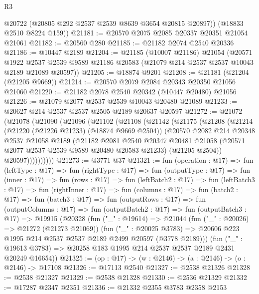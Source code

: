 \begin{lexlean}{R3}
\begin{coremodule}
        @20722
        (@20805 @292 @2537 @2539 @8639 @3654 @20815 @20897))
      (@18833 @2510 @8224 @159))
@21181 := @20570 @2075 @2085 @20337 @20351 @21054 @21061
@21182 := @20560 @280
@21185 := @21182 @2074 @2540 @20336
@21186 := @10447 @2189
@21204 := @21185
    (@10007 @21186)
    @21054
    (@20571
      @1922
      @2537
      @2539
      @9589
      @21186
      @20583
      (@21079 @214 @2537 @2537 @10043 @2189 @21089 @20597))
@21205 := @18874 @9201
@21208 := @21181 (@21204 (@21205 @9669))
@21214 := @20570 @2079 @2084 @20343 @20350 @21056 @21060
@21220 := @21182 @2078 @2540 @20342 (@10447 @20480) @21056
@21226 := @21079 @2077 @2537 @2539 @10043 @20480 @21089
@21233 := @20627 @214 @2537 @2537 @2505 @2189 @20637 @20597
@21272 := @21072
    (@21078
      (@21090
        (@21096
          (@21102
            (@21108
              (@21142
                (@21175
                  (@21208
                    (@21214
                      (@21220 (@21226 @21233) (@18874 @9669 @2504))
                      (@20570
                        @2082
                        @214
                        @20348
                        @2537
                        @21058
                        @2189
                        (@21182
                          @2081
                          @2540
                          @20347
                          @20481
                          @21058
                          (@20571 @2077 @2537 @2539 @9589 @20480 @20583 @21233)
                          (@21205 @2504))
                        @20597))))))))))
@21273 := @3771 @37
@21321 := fun (operation : @17) =>
  fun (leftType : @17) =>
  fun (rightType : @17) =>
  fun (outputType : @17) =>
  fun (inner : @17) =>
  fun (rows : @17) =>
  fun (leftBatch2 : @17) =>
  fun (leftBatch3 : @17) =>
  fun (rightInner : @17) =>
  fun (columns : @17) =>
  fun (batch2 : @17) =>
  fun (batch3 : @17) =>
  fun (outputRows : @17) =>
  fun (outputColumns : @17) =>
  fun (outputBatch2 : @17) =>
  fun (outputBatch3 : @17) =>
  @19915
    (@20328
      (fun ("_" : @19614) =>
      @21044
        (fun ("_" : @20026) => @21272 (@21273 @21069))
        (fun ("_" : @20025 @3783) =>
        @20606 @223 @1995 @214 @2537 @2537 @2189 @2499 @20597 (@3778 @2189)))
      (fun ("_" : @19613 @3783) => @20258 @183 @1995 @214 @2537 @2537 @2189 @2431 @20249 @16654))
@21325 := (op : @17) -> (w : @2146) -> (a : @2146) -> (o : @2146) -> @17108
@21326 := @17113 @2540
@21327 := @2538 @21326
@21328 := @2538 @21327
@21329 := @2538 @21328
@21330 := @2536 @21329
@21332 := @17287 @2347 @2351
@21336 := @21332 @2355 @3783 @2358 @2153

\end{coremodule}
\end{lexlean}
